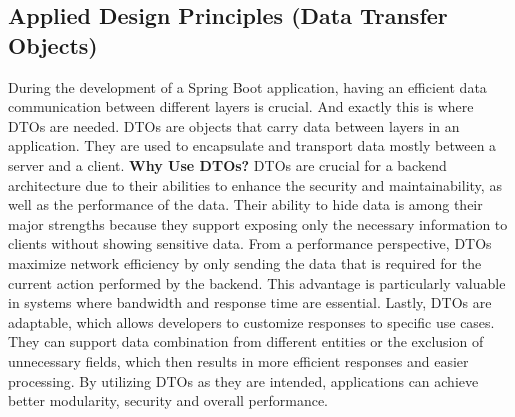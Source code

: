     \subsection{Applied Design Principles (Data Transfer Objects)}
    During the development of a Spring Boot application, having an efficient data communication between different layers is crucial. And exactly this is where DTOs are needed. \newline
    DTOs are objects that carry data between layers in an application. They are used to encapsulate and transport data mostly between a server and a client.
    \newline \newline
    \textbf{Why Use DTOs?} \newline
    DTOs are crucial for a backend architecture due to their abilities to enhance the security and maintainability, as well as the performance of the data. Their ability to hide data is among their major strengths because they support exposing only the necessary information to clients without showing sensitive data. \newline
    From a performance perspective, DTOs maximize network efficiency by only sending the data that is required for the current action performed by the backend. This advantage is particularly valuable in systems where bandwidth and response time are essential. \newline
    Lastly, DTOs are adaptable, which allows developers to customize responses to specific use cases. They can support data combination from different entities or the exclusion of unnecessary fields, which then results in more efficient responses and easier processing. \newline
    By utilizing DTOs as they are intended, applications can achieve better modularity, security and overall performance. 

    \newpage

